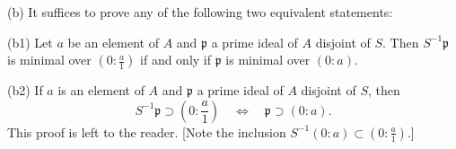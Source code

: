 \documentclass[parskip=half,fontsize=12pt]{scrartcl}%
\newcommand{\mf}{\mathfrak}
\newcommand{\ppp}{\mf p}
\newcommand{\bu}{\bullet}
\begin{document}
\begin{comment}
$\bu$ \textbf{Proof of the inclusion} 
\begin{equation}\label{da}
D(S^{-1}A)\subset D(A)\cap\Sp(S^{-1}A):
\end{equation}
To start the proof of \eqref{da}, let $\ppp$ be a prime ideal of $A$ disjoint from $S$ such that $S^{-1}\ppp\in D(S^{-1}A)$. It suffices to show $\ppp\in D(A)$. Note that $S^{-1}\ppp$ is minimal over $(0:\frac a1)$ for some $a\in A$. %
It suffices to show that %
\begin{equation}\label{da2}
\ppp\text{ is minimal over }(0:a).
\end{equation}

To prove \eqref{da2} we start by proving:

\textbf{Claim 3:} $(0:a)\subset\ppp$.

\emph{Proof of Claim 3.} Let $b\in A$ satisfy $ab=0$. It is enough to check $b\in\ppp$. We have $\frac a1\frac b1=0$, hence $\frac b1\in(0:\frac a1)\subset S^{-1}\ppp$, and thus $b\in\ppp$. $\square$

To complete the proof of \eqref{da2}, assume by contradiction that there is a prime ideal $\ppp'$ such that 
$$
(0:a)\subset\ppp'<\ppp.
$$ 
\textbf{Claim 4:} $(0:\frac a1)\subset S^{-1}\ppp'$.

\emph{Proof of Claim 4.} Assuming $\frac bs\frac a1=0$ (obvious notation), we get $abt=0$ for some $t\in S$, hence $bt\in(0:a)\subset\ppp'$, hence $b\in\ppp'$, and thus $\frac bs\in S^{-1}\ppp'$. $\square$ 

To complete the proof of \eqref{da2}, note that we get 
$$
\left(0:\frac a1\right)\subset S^{-1}\ppp'<S^{-1}\ppp,
$$ 
contradicting the minimality of $S^{-1}\ppp$ over $(0:\frac a1)$. %
$\square$
\end{comment}

(b) It suffices to prove any of the following two equivalent statements: 

(b1) Let $a$ be an element of $A$ and $\ppp$ a prime ideal of $A$ disjoint of $S$. Then $S^{-1}\ppp$ is minimal over $(0:\frac a1)$ if and only if $\ppp$ is minimal over $(0:a)$.

(b2) If $a$ is an element of $A$ and $\ppp$ a prime ideal of $A$ disjoint of $S$, then 
$$
S^{-1}\ppp\supset\left(0:\frac a1\right)\quad\iff\quad\ppp\supset(0:a).
$$
This proof is left to the reader. [Note the inclusion $S^{-1}(0:a)\subset(0:\frac a1)$.]
\end{document}
